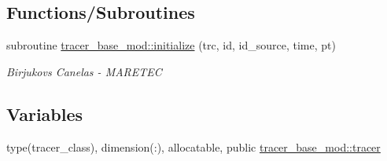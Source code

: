 \subsection*{Functions/\+Subroutines}
\begin{DoxyCompactItemize}
\item 
subroutine \hyperlink{namespacetracer__base__mod_ae73e3d1fd8818cf3e1a8593aafebea43}{tracer\+\_\+base\+\_\+mod\+::initialize} (trc, id, id\+\_\+source, time, pt)
\begin{DoxyCompactList}\small\item\em Birjukovs Canelas -\/ M\+A\+R\+E\+T\+EC \end{DoxyCompactList}\end{DoxyCompactItemize}
\subsection*{Variables}
\begin{DoxyCompactItemize}
\item 
type(tracer\+\_\+class), dimension(\+:), allocatable, public \hyperlink{namespacetracer__base__mod_a8e683639ef8cd4f4bdcff33fffe21fc2}{tracer\+\_\+base\+\_\+mod\+::tracer}
\end{DoxyCompactItemize}
